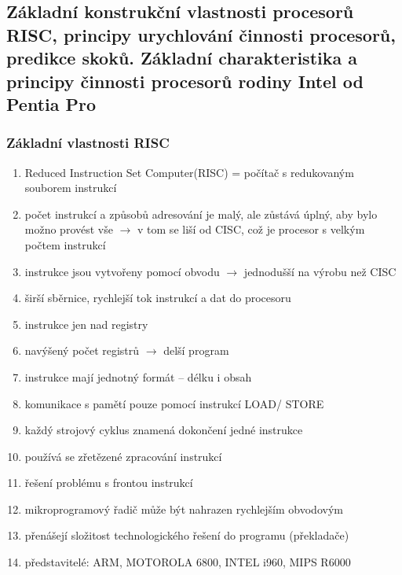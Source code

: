 \subsection[Procesory RISC, Charakteristika procesoru Intel]{Základní konstrukční vlastnosti procesorů RISC, principy urychlování činnosti procesorů, predikce skoků. Základní charakteristika a principy činnosti procesorů rodiny Intel od Pentia Pro}

\subsubsection{Základní vlastnosti RISC}
\begin{enumerate}
\item Reduced Instruction Set Computer(RISC)  =  počítač s redukovaným souborem instrukcí
\item počet instrukcí a způsobů adresování je malý, ale zůstává úplný, aby bylo možno provést vše $\rightarrow$ v tom se liší od CISC, což je procesor s velkým počtem instrukcí
\item instrukce jsou vytvořeny pomocí obvodu $\rightarrow$ jednodušší na výrobu než CISC
\item širší sběrnice, rychlejší tok instrukcí a dat do procesoru
\item instrukce jen nad registry
\item navýšený počet registrů $\rightarrow$ delší program
\item instrukce mají jednotný formát -- délku i obsah
\item komunikace s pamětí pouze pomocí instrukcí  LOAD/ STORE
\item každý strojový cyklus znamená dokončení jedné instrukce
\item používá se zřetězené zpracování instrukcí
\item řešení problému s frontou instrukcí
\item mikroprogramový řadič může být nahrazen rychlejším obvodovým
\item přenášejí složitost technologického řešení do programu (překladače)
\item představitelé: ARM, MOTOROLA 6800, INTEL i960, MIPS R6000
\end{enumerate}

